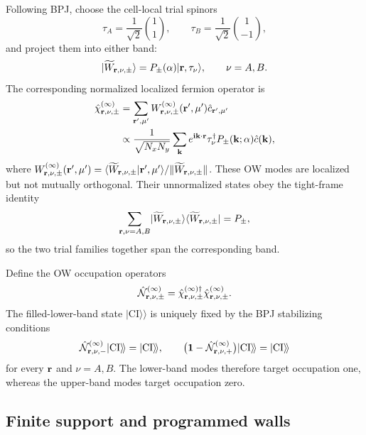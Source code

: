 \documentclass[aps,prx,twocolumn,superscriptaddress,longbibliography,nofootinbib,floatfix]{revtex4-2}
\newcommand{\ii}{\boldsymbol{\mathrm{i}}}
\newcommand{\mc}[1]{\mathcal{#1}}
\newcommand{\mr}[1]{\mathrm{#1}}
\newcommand{\mbf}[1]{\mathbf{#1}}
\newcommand{\h}[1]{\hat{#1}}
\newcommand{\Id}{\mathbf{1}}
\newcommand{\hcN}{\h{\mc{N}}}
\newcommand{\bfr}{{\bf r}}
\newcommand{\CI}{|{\mr{CI}} \rangle\!\rangle}
\begin{document}
Following BPJ, choose the cell-local trial spinors
\begin{equation}
 \tau_A=\frac{1}{\sqrt2}\binom{1}{1},
 \qquad
 \tau_B=\frac{1}{\sqrt2}\binom{1}{-1},
 \label{eq:bpj-trial-spinors}
\end{equation}
and project them into either band:
\begin{equation}
 \lvert\widetilde W_{\bfr,\nu,\pm}\rangle
 =P_\pm(\alpha)\lvert\bfr,\tau_\nu\rangle,
 \qquad \nu=A,B.
 \label{eq:projected-wannier-frame}
\end{equation}
The corresponding normalized localized fermion operator is
\begin{align}
 \h\chi^{(\infty)}_{\bfr,\nu,\pm}
 &=\sum_{\bfr',\mu'}
 W^{(\infty)}_{\bfr,\nu,\pm}(\bfr',\mu')
 \h c_{\bfr',\mu'}
 \nonumber\\
 &\propto\frac{1}{\sqrt{N_xN_y}}\sum_{\mbf k}
 e^{\ii\mbf k\cdot\bfr}
 \tau_\nu^\dagger P_\pm(\mbf k;\alpha)\h c(\mbf k),
 \label{eq:ow-annihilation-operator}
\end{align}
where
\(W^{(\infty)}_{\bfr,\nu,\pm}(\bfr',\mu')
=\langle\widetilde W_{\bfr,\nu,\pm}\vert\bfr',\mu'\rangle/
\|\widetilde W_{\bfr,\nu,\pm}\|\).
These OW modes are localized but not mutually orthogonal.  Their unnormalized
states obey the tight-frame identity
\begin{equation}
 \sum_{\bfr,\nu=A,B}
 \lvert\widetilde W_{\bfr,\nu,\pm}\rangle
 \langle\widetilde W_{\bfr,\nu,\pm}\rvert=P_\pm,
 \label{eq:ow-tight-frame}
\end{equation}
so the two trial families together span the corresponding band.

Define the OW occupation operators
\begin{equation}
 \hcN^{(\infty)}_{\bfr,\nu,\pm}
 =\h\chi^{(\infty)\dagger}_{\bfr,\nu,\pm}
  \h\chi^{(\infty)}_{\bfr,\nu,\pm}.
 \label{eq:ow-number-operator}
\end{equation}
The filled-lower-band state \(\CI\) is uniquely fixed by the BPJ stabilizing
conditions
\begin{equation}
 \hcN^{(\infty)}_{\bfr,\nu,-}\CI=\CI,
 \qquad
 \bigl(\Id-\hcN^{(\infty)}_{\bfr,\nu,+}\bigr)\CI=\CI
 \label{eq:ow-stabilizer-target}
\end{equation}
for every \(\bfr\) and \(\nu=A,B\).  The lower-band modes therefore target
occupation one, whereas the upper-band modes target occupation zero.

\subsection{Finite support and programmed walls}
\end{document}

